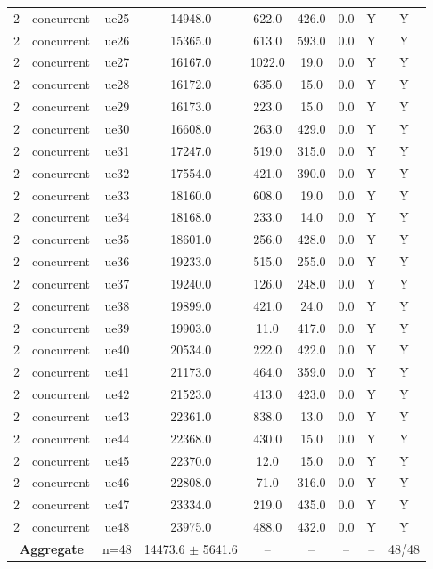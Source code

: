 \begin{table}[ht]
\begin{tabular}{|c|c|c|c|c|c|c|c|c|}
2 & concurrent & ue25 & 14948.0 & 622.0 & 426.0 & 0.0 & Y & Y \\
2 & concurrent & ue26 & 15365.0 & 613.0 & 593.0 & 0.0 & Y & Y \\
2 & concurrent & ue27 & 16167.0 & 1022.0 & 19.0 & 0.0 & Y & Y \\
2 & concurrent & ue28 & 16172.0 & 635.0 & 15.0 & 0.0 & Y & Y \\
2 & concurrent & ue29 & 16173.0 & 223.0 & 15.0 & 0.0 & Y & Y \\
2 & concurrent & ue30 & 16608.0 & 263.0 & 429.0 & 0.0 & Y & Y \\
2 & concurrent & ue31 & 17247.0 & 519.0 & 315.0 & 0.0 & Y & Y \\
2 & concurrent & ue32 & 17554.0 & 421.0 & 390.0 & 0.0 & Y & Y \\
2 & concurrent & ue33 & 18160.0 & 608.0 & 19.0 & 0.0 & Y & Y \\
2 & concurrent & ue34 & 18168.0 & 233.0 & 14.0 & 0.0 & Y & Y \\
2 & concurrent & ue35 & 18601.0 & 256.0 & 428.0 & 0.0 & Y & Y \\
2 & concurrent & ue36 & 19233.0 & 515.0 & 255.0 & 0.0 & Y & Y \\
2 & concurrent & ue37 & 19240.0 & 126.0 & 248.0 & 0.0 & Y & Y \\
2 & concurrent & ue38 & 19899.0 & 421.0 & 24.0 & 0.0 & Y & Y \\
2 & concurrent & ue39 & 19903.0 & 11.0 & 417.0 & 0.0 & Y & Y \\
2 & concurrent & ue40 & 20534.0 & 222.0 & 422.0 & 0.0 & Y & Y \\
2 & concurrent & ue41 & 21173.0 & 464.0 & 359.0 & 0.0 & Y & Y \\
2 & concurrent & ue42 & 21523.0 & 413.0 & 423.0 & 0.0 & Y & Y \\
2 & concurrent & ue43 & 22361.0 & 838.0 & 13.0 & 0.0 & Y & Y \\
2 & concurrent & ue44 & 22368.0 & 430.0 & 15.0 & 0.0 & Y & Y \\
2 & concurrent & ue45 & 22370.0 & 12.0 & 15.0 & 0.0 & Y & Y \\
2 & concurrent & ue46 & 22808.0 & 71.0 & 316.0 & 0.0 & Y & Y \\
2 & concurrent & ue47 & 23334.0 & 219.0 & 435.0 & 0.0 & Y & Y \\
2 & concurrent & ue48 & 23975.0 & 488.0 & 432.0 & 0.0 & Y & Y \\
\multicolumn{2}{|c|}{\textbf{Aggregate}} & n=48 & 14473.6 $\pm$ 5641.6 & -- & -- & -- & -- & 48/48 \\

\end{tabular}
\end{table}
